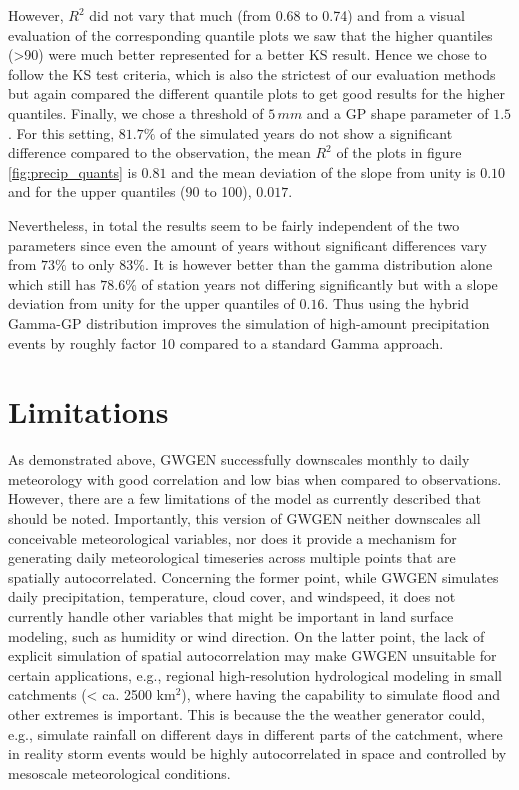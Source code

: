 \begin{refsection}
However, $R^2$ did not vary that much (from 0.68 to 0.74) and from a visual evaluation of the corresponding quantile plots we saw that the higher quantiles (>90) were much better represented for a better KS result. Hence we chose to follow the KS test criteria, which is also the strictest of our evaluation methods but again compared the different quantile plots to get good results for the higher quantiles.  Finally, we chose a threshold of $5\,\unit{mm}$ and a GP shape parameter of $1.5$. For this setting, $81.7\%$ of the simulated years do not show a significant difference compared to the observation, the mean $R^2$ of the plots in figure \ref{fig:precip_quants} is $0.81$ and the mean deviation of the slope from unity is $0.10$ and for the upper quantiles (90 to 100), $0.017$.

Nevertheless, in total the results seem to be fairly independent of the two parameters since even the amount of years without significant differences vary from $73\%$ to only $83\%$. It is however better than the gamma distribution alone which still has $78.6\%$ of station years not differing significantly but with a slope deviation from unity for the upper quantiles of $0.16$. Thus using the hybrid Gamma-GP distribution improves the simulation of high-amount precipitation events by roughly factor 10 compared to a standard Gamma approach.

\section{Limitations} \label{sec:limits}
As demonstrated above, GWGEN successfully downscales monthly to daily meteorology with good correlation and low bias when compared to observations. However, there are a few limitations of the model as currently described that should be noted. Importantly, this version of GWGEN neither downscales all conceivable meteorological variables, nor does it provide a mechanism for generating daily meteorological timeseries across multiple points that are spatially autocorrelated. Concerning the former point, while GWGEN simulates daily precipitation, temperature, cloud cover, and windspeed, it does not currently handle other variables that might be important in land surface modeling, such as humidity or wind direction. On the latter point, the lack of explicit simulation of spatial autocorrelation may make GWGEN unsuitable for certain applications, e.g., regional high-resolution hydrological modeling in small catchments (< ca. 2500 km$^2$), where having the capability to simulate flood and other extremes is important. This is because the the weather generator could, e.g., simulate rainfall on different days in different parts of the catchment, where in reality storm events would be highly autocorrelated in space and controlled by mesoscale meteorological conditions.


\end{refsection}
